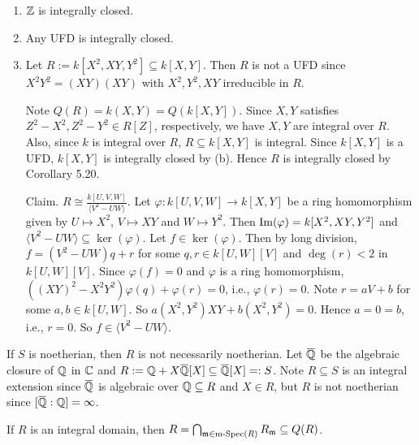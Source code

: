 \begin{example}\label{5.32}
    \begin{enumerate}
        \item $\mathbb{Z}$ is integrally closed.
        \item Any UFD is integrally closed.
        \item Let $R := k[X^{2},XY,Y^{2}] \subseteq k[X,Y]$. Then $R$ is not a UFD since $X^{2}Y^{2} = (XY)(XY)$ with $X^{2},Y^{2},XY$ irreducible in $R$. \par 
            Note $Q(R) = k(X,Y) = Q(k[X,Y])$. Since $X,Y$ satisfies $Z^{2}-X^{2},Z^{2}-Y^{2} \in R[Z]$, respectively, we have $X,Y$ are integral over $R$. Also, since $k$ is integral over $R$, $R \subseteq k[X,Y]$ is integral. Since $k[X,Y]$ is a UFD, $k[X,Y]$ is integrally closed by (b). Hence $R$ is integrally closed by Corollary 5.20. \par 
            Claim. $R \cong \frac{k[U,V,W]}{\langle V^{2}-UW \rangle}$. Let $\varphi: k[U,V,W] \to k[X,Y]$ be a ring homomorphism given by $U \mapsto X^{2}$, $V \mapsto XY$ and $W \mapsto Y^{2}$. Then $\operatorname{Im}(\varphi) = k[X^{2},XY,Y^{2}]$ and $\langle V^{2}-UW \rangle \subseteq \ker(\varphi)$. Let $f \in \ker(\varphi)$. Then by long division, $f = (V^{2}-UW)q + r$ for some $q,r \in k[U,W][V]$ and $\deg(r) < 2$ in $k[U,W][V]$. Since $\varphi(f) = 0$ and $\varphi$ is a ring homomorphism, $((XY)^{2}-X^{2}Y^{2})\varphi(q) + \varphi(r)=0$, i.e., $\varphi(r) = 0$. Note $r = aV+b$ for some $a,b\in k[U,W]$. So $a(X^{2},Y^{2})XY + b(X^{2},Y^{2}) = 0$. Hence $a= 0 = b$, i.e., $r = 0$. So $f \in \langle V^{2}-UW \rangle$. 
    \end{enumerate}
\end{example}

\begin{example*}
    If $S$ is noetherian, then $R$ is not necessarily noetherian. Let $\overbar{\bbQ}$ be the algebraic closure of $\mathbb{Q}$ in $\mathbb{C}$ and $R := \bbQ + X \overbar{\bbQ}[X] \subseteq \overbar{\bbQ}[X] =: S$. Note $R \subseteq S$ is an integral extension since $\overbar{\bbQ}$ is algebraic over $\mathbb{Q} \subseteq R$ and $X \in R$, but $R$ is not noetherian since $[\overbar{\bbQ}:\bbQ] = \infty$.
\end{example*}

\begin{lemma}\label{5.33}
    If $R$ is an integral domain, then $R = \bigcap_{\mathfrak{m} \in \operatorname{m-Spec}(R)} R_{\mathfrak{m}} \subseteq Q(R)$. 
\end{lemma}


